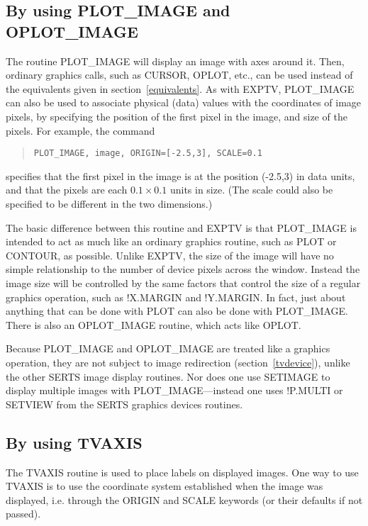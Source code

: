 \subsection{By using PLOT\_IMAGE and OPLOT\_IMAGE}
\label{plot_image}

The routine PLOT\_IMAGE will display an image with axes around it.  Then,
ordinary graphics calls, such as CURSOR, OPLOT, etc., can be used instead of
the equivalents given in section~\ref{equivalents}.  As with EXPTV, PLOT\_IMAGE
can also be used to associate physical (data) values with the coordinates of
image pixels, by specifying the position of the first pixel in the image, and
size of the pixels.  For example, the command
\begin{quote}
\begin{verbatim}
PLOT_IMAGE, image, ORIGIN=[-2.5,3], SCALE=0.1
\end{verbatim}
\end{quote}
specifies that the first pixel in the image is at the position (-2.5,3) in data
units, and that the pixels are each \mbox{$0.1 \times 0.1$} units in size.
(The scale could also be specified to be different in the two dimensions.)

The basic difference between this routine and EXPTV is that PLOT\_IMAGE is
intended to act as much like an ordinary graphics routine, such as PLOT or
CONTOUR, as possible.  Unlike EXPTV, the size of the image will have no simple
relationship to the number of device pixels across the window.  Instead the
image size will be controlled by the same factors that control the size of a
regular graphics operation, such as !X.MARGIN and !Y.MARGIN.  In fact, just
about anything that can be done with PLOT can also be done with PLOT\_IMAGE.
There is also an OPLOT\_IMAGE routine, which acts like OPLOT.

Because PLOT\_IMAGE and OPLOT\_IMAGE are treated like a graphics operation,
they are not subject to image redirection (section~\ref{tvdevice}), unlike the
other SERTS image display routines.  Nor does one use SETIMAGE to display
multiple images with PLOT\_IMAGE---instead one uses !P.MULTI or SETVIEW from
the SERTS graphics devices routines.

\subsection{By using TVAXIS}
\label{tvaxis}

The TVAXIS routine is used to place labels on displayed images.  One way to use
TVAXIS is to use the coordinate system established when the image was
displayed, i.e. through the ORIGIN and SCALE keywords (or their defaults if not
passed).

